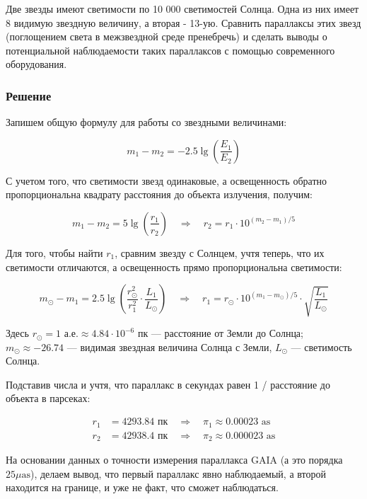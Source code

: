 \documentclass[a4paper, 12pt]{article}
\newcommand{\qrq}
{\ensuremath{\quad \Rightarrow \quad}} %
\begin{document}
Две звезды имеют светимости по 10 000 светимостей Солнца. Одна из них имеет 8 видимую звездную величину, а вторая - 13-ую. Сравнить параллаксы этих звезд (поглощением света в межзвездной среде пренебречь) и сделать выводы о потенциальной наблюдаемости таких параллаксов с помощью современного оборудования.

\subsubsection*{Решение}

Запишем общую формулу для работы со звездными величинами:

\begin{equation}
	m_1 - m_2 = -2.5 \lg \left(\frac{E_1}{E_2}\right)
\end{equation}

С учетом того, что светимости звезд одинаковые, а освещенность обратно пропорциональна квадрату расстояния до объекта излучения, получим:

\begin{equation}
	m_1 - m_2 = 5 \lg\left(\frac{r_1}{r_2}\right) \qrq r_2 = r_1 \cdot 10^{(m_2 - m_1) / 5}
\end{equation}

Для того, чтобы найти $r_1$, сравним звезду с Солнцем, учтя теперь, что их светимости отличаются, а освещенность прямо пропорциональна светимости:

\begin{equation}
	m_\odot - m_1 = 2.5 \lg \left(\frac{r_{\odot}^2}{r_1^2} \cdot \frac{L_1}{L_{\odot}}\right) \qrq r_1 = r_{\odot} \cdot 10^{(m_1 - m_{\odot}) / 5} \cdot \sqrt{\frac{L_1}{L_{\odot}}}
\end{equation}

Здесь $r_{\odot} = 1 \text{ а.е.} \approx 4.84\cdot 10^{-6} \text{ пк}$ --- расстояние от Земли до Солнца; $m_\odot \approx -26.74$ --- видимая звездная величина Солнца с Земли, $L_{\odot}$ --- светимость Солнца.

Подставив числа и учтя, что параллакс в секундах равен 1 / расстояние  до объекта в парсеках:

\begin{align*}
	r_1 &= 4293.84 \text{ пк} \qrq \boxed{\pi_1 \approx 0.00023\text{ as}}\\
	r_2 &= 42938.4 \text{ пк} \qrq \boxed{\pi_2 \approx 0.000023\text{ as}}
\end{align*}

На основании данных о точности измерения параллакса GAIA (а это порядка $25 \mu\text{as}$), делаем вывод, что первый параллакс явно наблюдаемый, а второй находится на границе, и уже не факт, что сможет наблюдаться.
\end{document}
